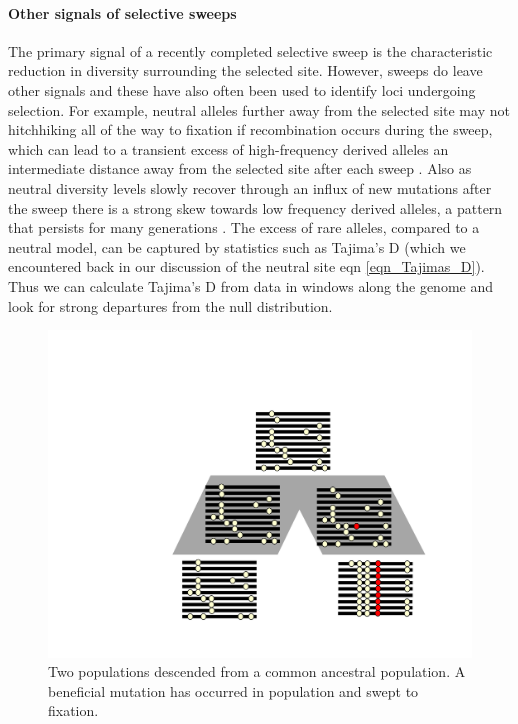 \paragraph{Other signals of selective sweeps}
The primary signal of a recently completed selective sweep is the
characteristic reduction in diversity surrounding the selected site.
However, sweeps do leave other signals and these have also often been
used to identify loci undergoing selection. 
For example, neutral alleles further away from the selected site may not
hitchhiking all of the way to fixation if recombination occurs during
the sweep, which can lead to a transient excess of high-frequency
derived alleles an intermediate distance away from the selected site
after each sweep \citep{Fay:00,Przeworski:02,Kim:06}.
Also as neutral diversity levels slowly recover through an influx of
new mutations after the sweep there is a strong skew towards low
frequency derived alleles, a pattern that persists for many
generations \citep{Braverman:95, Przeworski:02,Kim:06}. The excess of
rare alleles, compared to a neutral model, can be captured by statistics such as Tajima's D (which
we encountered back in our discussion of the neutral site eqn
\ref{eqn_Tajimas_D}). Thus we can calculate Tajima's D from data in
windows along the genome and look for
strong departures from the null distribution.


\begin{figure}
\begin{center}
\includegraphics[width=0.7 \textwidth]{figures/Hitchhiking/two_pops_sweep.pdf}
\end{center}
\caption{Two populations descended from a common ancestral
  population. A beneficial mutation has occurred in population and
  swept to fixation.} \label{fig:local_sweep_haps}
\end{figure}

